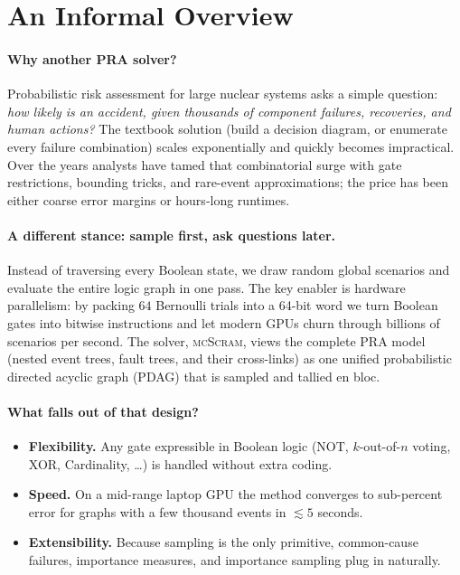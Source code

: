 
\section*{An Informal Overview}

\paragraph*{Why another PRA solver?}
Probabilistic risk assessment for large nuclear systems asks a simple
question: \emph{how likely is an accident, given thousands of component
failures, recoveries, and human actions?} The textbook solution (build a decision diagram, or enumerate every failure combination) scales exponentially and quickly becomes impractical. Over the years analysts have tamed that
combinatorial surge with gate restrictions, bounding tricks, and
rare-event approximations; the price has been either coarse error
margins or hours‐long runtimes.


\paragraph*{A different stance: sample first, ask questions later.}
Instead of traversing every Boolean state, we draw random global
scenarios and evaluate the entire logic graph in one pass.
The key enabler is hardware parallelism: by packing \(64\)
Bernoulli trials into a 64-bit word we turn Boolean gates into
bitwise instructions and let modern GPUs churn through billions of
scenarios per second. The solver, \textsc{mcScram}, views the complete
PRA model (nested event trees, fault trees, and their cross-links) as
one unified probabilistic directed acyclic graph (PDAG) that is sampled
and tallied en bloc.

\paragraph*{What falls out of that design?}
\begin{itemize}
  \item \textbf{Flexibility.}  Any gate expressible in Boolean logic
        (NOT, \(k\)-out-of-\(n\) voting, XOR, Cardinality, \dots) is handled
        without extra coding.
  \item \textbf{Speed.}  On a mid-range laptop GPU the method converges
        to sub-percent error for graphs with a few thousand events in
        \(\lesssim 5\) seconds.
  \item \textbf{Extensibility.}  Because sampling is the only primitive,
        common-cause failures, importance measures, and importance
        sampling plug in naturally.
\end{itemize}

